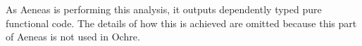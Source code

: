 \documentclass[12pt,twoside]{report}
\begin{document}
As Aeneas is performing this analysis, it outputs dependently typed pure functional code. The details of how this is achieved are omitted because this part of Aeneas is not used in Ochre. 





\end{document}
